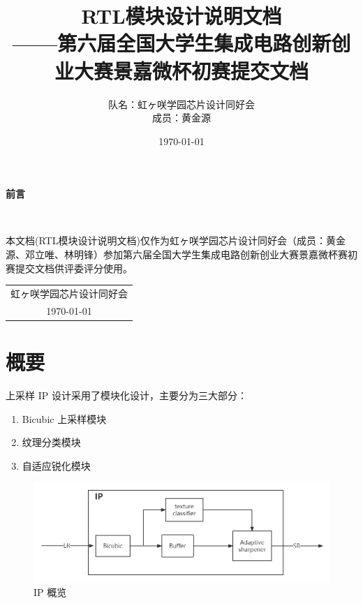 \documentclass[12pt, a4paper, oneside]{ctexbook}
\title{{\Huge{\textbf{RTL模块设计说明文档}}}\normalsize{\\——第六届全国大学生集成电路创新创业大赛景嘉微杯初赛提交文档}}
\author{队名：虹ヶ咲学园芯片设计同好会\\ 成员：黄金源\space邓立唯\space林明锋}
\date{\today}
\begin{document}
	\maketitle	
	\setcounter{page}{1}
	\begin{center}
		\Huge\textbf{前言}
	\end{center}~\
	
	本文档(RTL模块设计说明文档)仅作为虹ヶ咲学园芯片设计同好会（成员：黄金源、邓立唯、林明锋）参加第六届全国大学生集成电路创新创业大赛景嘉微杯赛初赛提交文档供评委评分使用。
	~\\
	\begin{flushright}
		\begin{tabular}{c}
			虹ヶ咲学园芯片设计同好会\\
			\today
		\end{tabular}
	\end{flushright}
	\newpage
	\setcounter{page}{1}
	\tableofcontents
	\newpage
	\setcounter{page}{1}
	
	\chapter{概要}
	上采样 IP 设计采用了模块化设计，主要分为三大部分：
	\begin{enumerate}
		\item Bicubic 上采样模块
		\item 纹理分类模块
		\item 自适应锐化模块
	\end{enumerate}
	
	\begin{figure}[h]
		\centering
		\includegraphics[scale=0.5]{pic/IP-overview}
		\caption{IP 概览}
		\label{fig:ip-overview}
	\end{figure}
	
\end{document}
